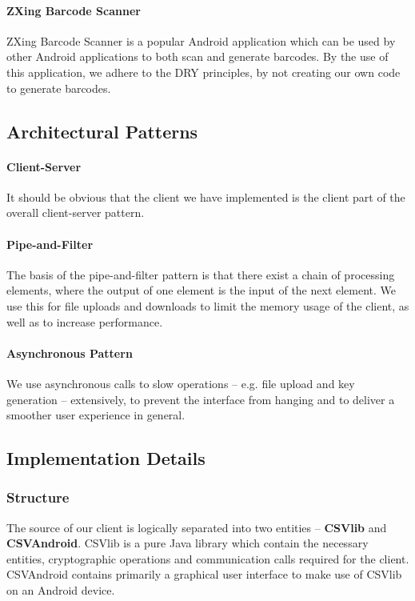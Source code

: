 \documentclass[pdftex,english,10pt,b5paper,twoside]{book}
\begin{document}
\paragraph{ZXing Barcode Scanner} ZXing Barcode Scanner is a popular Android
application which can be used by other Android applications to both scan and
generate barcodes. By the use of this application, we adhere to the \ac{DRY}
principles, by not creating our own code to generate barcodes.

\subsection{Architectural Patterns}

\paragraph{Client-Server} It should be obvious that the client we have
implemented is the client part of the overall client-server pattern.

\paragraph{Pipe-and-Filter} The basis of the pipe-and-filter pattern is that
there exist a chain of processing elements, where the output of one element is
the input of the next element. We use this for file uploads and downloads to
limit the memory usage of the client, as well as to increase performance.

\paragraph{Asynchronous Pattern} We use asynchronous calls to slow operations
-- e.g. file upload and key generation -- extensively, to prevent the interface
from hanging and to deliver a smoother user experience in general.

\subsection{Implementation Details}

\subsubsection{Structure}

The source of our client is logically separated into two entities --
\textbf{CSVlib} and \textbf{CSVAndroid}. CSVlib is a pure Java library which
contain the necessary entities, cryptographic operations and communication
calls required for the client. CSVAndroid contains primarily a graphical user
interface to make use of CSVlib on an Android device.
\end{document}
